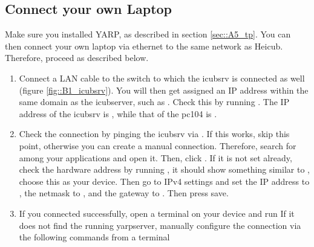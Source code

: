 \subsection{Connect your own Laptop}
Make sure you installed YARP, as described in section \ref{sec::A5_tp}. You can then connect your own laptop via ethernet to the same network as Heicub. Therefore, proceed as described below.
\begin{enumerate}
	\item  Connect a LAN cable to the switch to which the icubsrv is connected as well (figure \ref{fig::B1_icubsrv}). You will then get assigned an IP address within the same domain as the icubserver, such as . Check this by running . The IP address of the icubsrv is , while that of the pc104 is .
	\item  Check the connection by pinging the icubsrv via . If this works, skip this point, otherwise you can create a manual connection.  Therefore, search for  among your applications and open it. Then, click . If it is not set already, check the hardware address by running , it should show something similar to , choose this as your device. Then go to IPv4 settings and set the IP address to , the netmask to , and the gateway to . Then press save.
	\item If you connected successfully, open a terminal on your device and run \newline {} \newline If it does not find the running yarpserver, manually configure the connection via the following commands from a terminal \newline {} \newline {} \newline {}
\end{enumerate}
